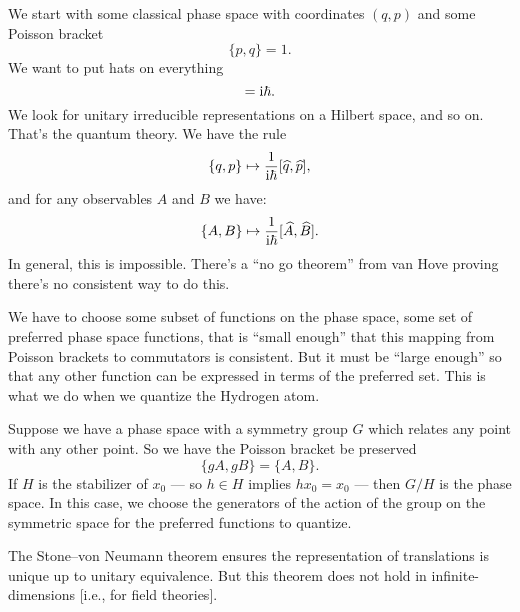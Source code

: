 We start with some classical phase space with coordinates $(q,p)$ and
some Poisson bracket
\begin{equation}
\{p,q\}=1.
\end{equation}
We want to put hats on everything
\begin{equation}
[\widehat{p},\widehat{q}]=\I\hbar.
\end{equation}
We look for unitary irreducible representations on a Hilbert space, and
so on. That's the quantum theory. We have the rule
\begin{equation}
\{q,p\}\mapsto\frac{1}{\mathrm{i}\hbar}[\widehat{q},\widehat{p}],
\end{equation}
and for any observables $A$ and $B$ we have:
\begin{equation}
\{A,B\}\mapsto\frac{1}{\mathrm{i}\hbar}[\widehat{A},\widehat{B}].
\end{equation}
In general, this is impossible. There's a ``no go theorem'' from van
Hove proving there's no consistent way to do this.

We have to choose some subset of functions on the phase space, some set
of preferred phase space functions, that is ``small enough'' that this
mapping from Poisson brackets to commutators is consistent. But it must
be ``large enough'' so that any other function can be expressed in terms
of the preferred set. This is what we do when we quantize the Hydrogen
atom.

Suppose we have a phase space with a symmetry group $G$ which relates
any point with any other point. So we have the Poisson bracket be
preserved
\begin{equation}
\{gA,gB\} = \{A,B\}.
\end{equation}
If $H$ is the stabilizer of $x_{0}$ --- so $h\in H$ implies
$hx_{0}=x_{0}$ --- then $G/H$ is the phase space. In this case, we
choose the generators of the action of the group on the symmetric space
for the preferred functions to quantize.

The Stone--von Neumann theorem ensures the representation of
translations is unique up to unitary equivalence. But this theorem does
not hold in infinite-dimensions [i.e., for field theories].

